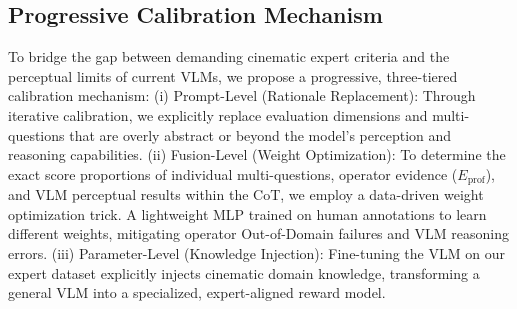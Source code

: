 \documentclass{article}
\begin{document}
\subsection{Progressive Calibration Mechanism}

To bridge the gap between demanding cinematic expert criteria and the perceptual limits of current VLMs, we propose a progressive, three-tiered calibration mechanism: (i) Prompt-Level (Rationale Replacement): Through iterative calibration, we explicitly replace evaluation dimensions and multi-questions that are overly abstract or beyond the model's perception and reasoning capabilities. (ii) Fusion-Level (Weight Optimization): To determine the exact score proportions of individual multi-questions, operator evidence ($E_{\text{prof}}$), and VLM perceptual results within the CoT, we employ a data-driven weight optimization trick. A lightweight MLP trained on human annotations to learn different weights, mitigating operator Out-of-Domain failures and VLM reasoning errors. (iii) Parameter-Level (Knowledge Injection): Fine-tuning the VLM on our expert dataset explicitly injects cinematic domain knowledge, transforming a general VLM into a specialized, expert-aligned reward model.



\end{document}
